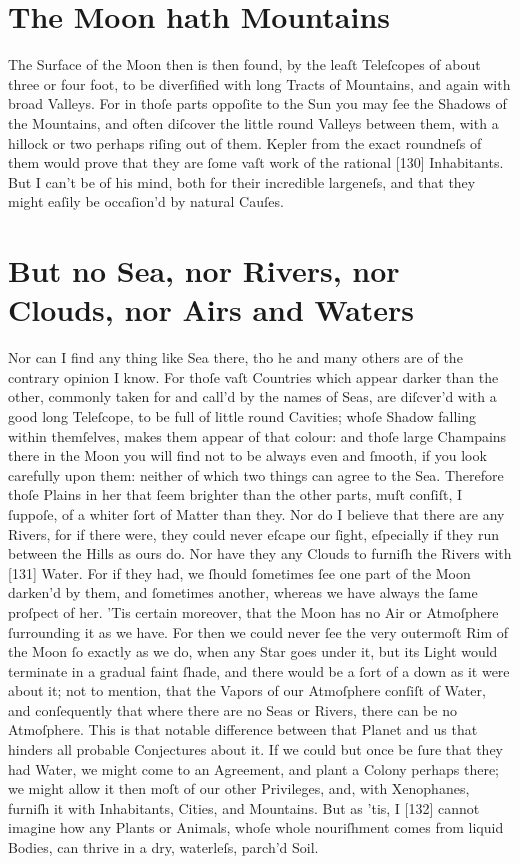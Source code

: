 \documentclass[letterpaper]{book}
\begin{document}
\section{The Moon hath Mountains}

The Surface of the Moon then is then found, by the leaſt Teleſcopes of
about three or four foot, to be diverſified with long Tracts of Mountains,
and again with broad Valleys. For in thoſe parts oppoſite to the Sun you
may ſee the Shadows of the Mountains, and often diſcover the little round
Valleys between them, with a hillock or two perhaps riſing out of them.
Kepler from the exact roundneſs of them would prove that they are ſome
vaſt work of the rational [130] Inhabitants. But I can't be of his mind, both
for their incredible largeneſs, and that they might eaſily be occaſion'd by
natural Cauſes.


\section{But no Sea, nor Rivers, nor Clouds, nor Airs and Waters}

Nor can I find any thing like Sea there, tho he and many others are of the
contrary opinion I know. For thoſe vaſt Countries which appear darker than
the other, commonly taken for and call'd by the names of Seas, are diſcver'd
with a good long Teleſcope, to be full of little round Cavities; whoſe
Shadow falling within themſelves, makes them appear of that colour: and
thoſe large Champains there in the Moon you will find not to be always even
and ſmooth, if you look carefully upon them: neither of which two things can
agree to the Sea. Therefore thoſe Plains in her that ſeem brighter than the
other parts, muſt conſiſt, I ſuppoſe, of a whiter ſort of Matter than they.
Nor do I believe that there are any Rivers, for if there were, they could
never eſcape our ſight, eſpecially if they run between the Hills as ours
do.  Nor have they any Clouds to furniſh the Rivers with [131] Water. For if
they had, we ſhould ſometimes ſee one part of the Moon darken'd by them, and
ſometimes another, whereas we have always the ſame proſpect of her.  'Tis
certain moreover, that the Moon has no Air or Atmoſphere ſurrounding it as
we have. For then we could never ſee the very outermoſt Rim of the Moon ſo
exactly as we do, when any Star goes under it, but its Light would terminate
in a gradual faint ſhade, and there would be a ſort of a down as it were
about it; not to mention, that the Vapors of our Atmoſphere conſiſt of
Water, and conſequently that where there are no Seas or Rivers, there can be
no Atmoſphere. This is that notable difference between that Planet and us
that hinders all probable Conjectures about it. If we could but once be ſure
that they had Water, we might come to an Agreement, and plant a Colony
perhaps there; we might allow it then moſt of our other Privileges, and,
with Xenophanes, furniſh it with Inhabitants, Cities, and Mountains. But as
'tis, I [132] cannot imagine how any Plants or Animals, whoſe whole
nouriſhment comes from liquid Bodies, can thrive in a dry, waterleſs,
parch'd Soil.
\end{document}
